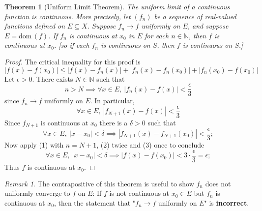 \documentclass[12pt, lettersize]{book}
\theoremstyle{plain}
\newtheorem{thm}{Theorem}[section]
\theoremstyle{definition}
\theoremstyle{remark}
\newtheorem*{rem}{Remark}
\newcommand{\N}{\mathbb{N}}
\newcommand{\dom}{\text{dom}\,}
\begin{document}
			\setcounter{equation}{0}
			\begin{thm}[Uniform Limit Theorem]\label{thm:24.3}
			The uniform limit of a continuous function is continuous. More precisely, let $(f_n)$ be a sequence of real-valued functions
			defined on $E\subseteq X$. Suppose $f_n\rightarrow f$ uniformly on $E$, and suppose $E=\dom(f)$. If $f_n$ is
			continuous at $x_0$ in $E$ for each $n\in\N$, then $f$ is continuous at $x_0$. [so if each $f_n$ is continuous on $S$, then $f$ is continuous on $S$.]
			\end{thm}
			\begin{proof}
			The critical inequality for this proof is
			\begin{equation}
				|f(x)-f(x_0)|\leq|f(x)-f_n(x)|+|f_n(x)-f_n(x_0)|+|f_n(x_0)-f(x_0)|
			\end{equation}
			Let $\epsilon>0$. There exists $N\in\N$ such that
			\begin{displaymath}
				n>N\implies \forall x\in E,\ |f_n(x)-f(x)|<\frac{\epsilon}{3}
			\end{displaymath}
			since $f_n\rightarrow f$ uniformly on $E$. In particular,
			\begin{equation}
				\forall x\in E,\ |f_{N+1}(x)-f(x)|<\frac{\epsilon}{3}
			\end{equation}
			Since $f_{N+1}$ is continuous at $x_0$ there is a $\delta>0$ such that
			\begin{equation}
				\forall x\in E,\ |x-x_0|<\delta\implies|f_{N+1}(x)-f_{N+1}(x_0)|<\frac{\epsilon}{3};
			\end{equation}
			Now apply (1) with $n=N+1$, (2) twice and (3) once to conclude
			\begin{displaymath}
				\forall x\in E,\ |x-x_0|<\delta\implies|f(x)-f(x_0)|<3\cdot\frac{\epsilon}{3}=\epsilon;
			\end{displaymath}
		 	Thus $f$ is continuous at $x_0$.
			\end{proof}
			\begin{rem}
				The contrapositive of this theorem is useful to show $f_n$ does not uniformly converge to $f$ on $E$:
				If $f$ is not continuous at $x_0\in E$ but $f_n$ is continuous at $x_0$, then the statement that "$f_n\rightarrow f$ uniformly on $E$" is \textbf{incorrect}.
			\end{rem}
			
			\newpage
			
\end{document}
